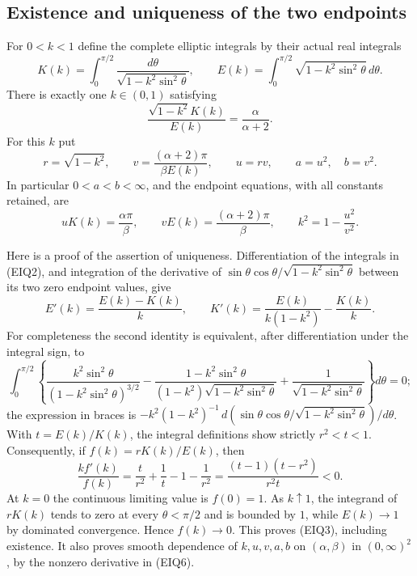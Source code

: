 \documentclass[11pt,a4paper]{article}
\begin{document}
\subsection{Existence and uniqueness of the two endpoints}
For $0<k<1$ define the complete elliptic integrals by their actual real
integrals
\begin{equation}\tag{EIQ2}
 K(k)=\int_0^{\pi/2}\frac{d\theta}
            {\sqrt{1-k^2\sin^2\theta}},\qquad
 E(k)=\int_0^{\pi/2}\sqrt{1-k^2\sin^2\theta}\,d\theta.
\end{equation}
There is exactly one $k\in(0,1)$ satisfying
\begin{equation}\tag{EIQ3}
 \frac{\sqrt{1-k^2}K(k)}{E(k)}=\frac{\alpha}{\alpha+2}.
\end{equation}
For this $k$ put
\begin{equation}\tag{EIQ4}
 r=\sqrt{1-k^2},\qquad
 v=\frac{(\alpha+2)\pi}{\beta E(k)},\qquad u=rv,
 \qquad a=u^2,\quad b=v^2.
\end{equation}
In particular $0<a<b<\infty$, and the endpoint equations, with all
constants retained, are
\begin{equation}\tag{EIQ5}
 uK(k)=\frac{\alpha\pi}{\beta},\qquad
 vE(k)=\frac{(\alpha+2)\pi}{\beta},\qquad
 k^2=1-\frac{u^2}{v^2}.
\end{equation}

Here is a proof of the assertion of uniqueness. Differentiation of the
integrals in (EIQ2), and integration of the derivative of
$\sin\theta\cos\theta/\sqrt{1-k^2\sin^2\theta}$ between its two zero
endpoint values, give
\[
 E'(k)=\frac{E(k)-K(k)}{k},\qquad
 K'(k)=\frac{E(k)}{k(1-k^2)}-\frac{K(k)}{k}.
\]
For completeness the second identity is equivalent, after differentiation
under the integral sign, to
\[
 \int_0^{\pi/2}
 \left\{\frac{k^2\sin^2\theta}{(1-k^2\sin^2\theta)^{3/2}}
 -\frac{1-k^2\sin^2\theta}{(1-k^2)\sqrt{1-k^2\sin^2\theta}}
 +\frac1{\sqrt{1-k^2\sin^2\theta}}\right\}d\theta=0;
\]
the expression in braces is
$-k^2(1-k^2)^{-1}\,d(\sin\theta\cos\theta/
\sqrt{1-k^2\sin^2\theta})/d\theta$.
With $t=E(k)/K(k)$, the integral definitions show strictly
$r^2<t<1$.  Consequently, if $f(k)=rK(k)/E(k)$, then
\begin{equation}\tag{EIQ6}
 \frac{kf'(k)}{f(k)}
 =\frac{t}{r^2}+\frac1t-1-\frac1{r^2}
 =\frac{(t-1)(t-r^2)}{r^2t}<0.
\end{equation}
At $k=0$ the continuous limiting value is $f(0)=1$.
As $k\uparrow1$, the integrand of $rK(k)$ tends to zero at every
$\theta<\pi/2$ and is bounded by $1$, while $E(k)\to1$ by dominated
convergence.  Hence $f(k)\to0$.  This proves (EIQ3), including existence.
It also proves smooth dependence of $k,u,v,a,b$ on $(\alpha,\beta)$ in
$(0,\infty)^2$, by the nonzero derivative in (EIQ6).
\end{document}
